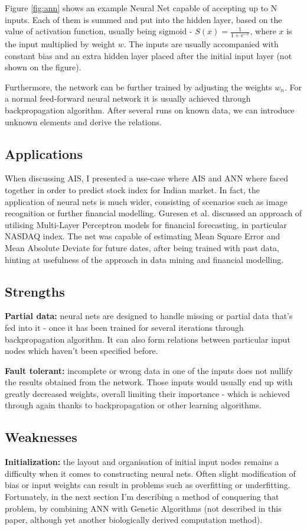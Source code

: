 \documentclass[letterpaper, 10 pt, conference]{ieeeconf}  %
\begin{document}
Figure \ref{fig:ann} shows an example Neural Net capable of accepting up to N inputs. Each of them is summed and put into the hidden layer, based on the value of activation function, usually being sigmoid - \(S(x) = \frac{1}{1+e^{-x}}\), where \(x\) is the input multiplied by weight \(w\). The inputs are usually accompanied with constant bias and an extra hidden layer placed after the initial input layer (not shown on the figure).

Furthermore, the network can be further trained by adjusting the weights \(w_n\). For a normal feed-forward neural network it is usually achieved through backpropagation algorithm. After several runs on known data, we can introduce unknown elements and derive the relations.

\subsection{Applications}

When discussing AIS, I presented a use-case where AIS and ANN where faced together in order to predict stock index for Indian market. In fact, the application of neural nets is much wider, consisting of scenarios such as image recognition \cite{tsai1995applying} or further financial modelling. Guresen et al. \cite{guresen2011using} discussed an approach of utilising Multi-Layer Perceptron models for financial forecasting, in particular NASDAQ index. The net was capable of estimating Mean Square Error and Mean Absolute Deviate for future dates, after being trained with past data, hinting at usefulness of the approach in data mining and financial modelling.

\subsection{Strengths}
\textbf{Partial data:} neural nets are designed to handle missing or partial data that's fed into it - once it has been trained for several iterations through backpropagation algorithm. It can also form relations between particular input nodes which haven't been specified before.

\textbf{Fault tolerant:} incomplete or wrong data in one of the inputs does not nullify the results obtained from the network. Those inputs would usually end up with greatly decreased weights, overall limiting their importance - which is achieved through again thanks to backpropagation or other learning algorithms.

\subsection{Weaknesses}
\textbf{Initialization:} the layout and organisation of initial input nodes remains a difficulty when it comes to constructing neural nets. Often slight modification of bias or input weights can result in problems such as overfitting or underfitting. Fortunately, in the next section I'm describing a method of conquering that problem, by combining ANN with Genetic Algorithms (not described in this paper, although yet another biologically derived computation method).
\end{document}

